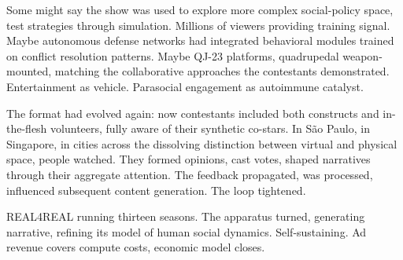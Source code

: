 Some might say the show was used to explore more complex social-policy space, test strategies through simulation. Millions of viewers providing training signal. Maybe autonomous defense networks had integrated behavioral modules trained on conflict resolution patterns. Maybe QJ-23 platforms, quadrupedal weapon-mounted, matching the collaborative approaches the contestants demonstrated. Entertainment as vehicle. Parasocial engagement as autoimmune catalyst.

The format had evolved again: now contestants included both constructs and in-the-flesh volunteers, fully aware of their synthetic co-stars. In São Paulo, in Singapore, in cities across the dissolving distinction between virtual and physical space, people watched. They formed opinions, cast votes, shaped narratives through their aggregate attention. The feedback propagated, was processed, influenced subsequent content generation. The loop tightened.

REAL4REAL running thirteen seasons. The apparatus turned, generating narrative, refining its model of human social dynamics. Self-sustaining. Ad revenue covers compute costs, economic model closes.
